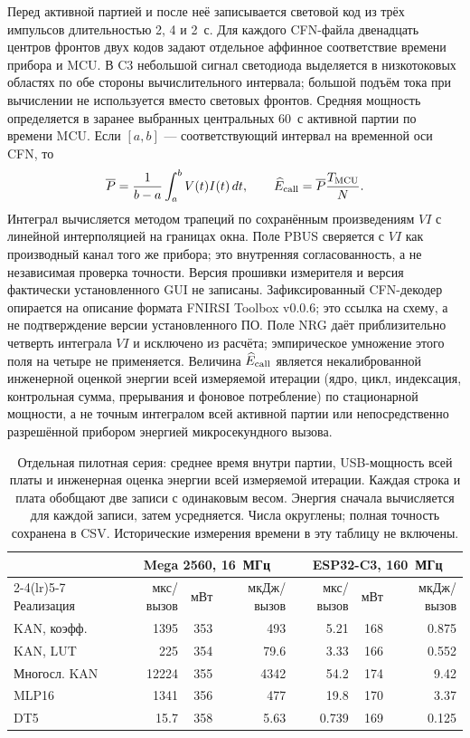 Перед активной партией и после неё записывается световой код из трёх импульсов длительностью 2, 4 и 2~с. Для каждого CFN-файла двенадцать центров фронтов двух кодов задают отдельное аффинное соответствие времени прибора и MCU. В C3 небольшой сигнал светодиода выделяется в низкотоковых областях по обе стороны вычислительного интервала; большой подъём тока при вычислении не используется вместо световых фронтов. Средняя мощность определяется в заранее выбранных центральных 60~с активной партии по времени MCU. Если $[a,b]$ --- соответствующий интервал на временной оси CFN, то
\begin{equation}
\overline P=\frac{1}{b-a}\int_a^b V(t)I(t)\,dt,
\qquad
\widehat E_{\rm call}=\overline P\frac{T_{\rm MCU}}{N}.
\label{eq:energy-pilot}
\end{equation}
Интеграл вычисляется методом трапеций по сохранённым произведениям $V I$ с линейной интерполяцией на границах окна. Поле PBUS сверяется с $V I$ как производный канал того же прибора; это внутренняя согласованность, а не независимая проверка точности. Версия прошивки измерителя и версия фактически установленного GUI не записаны. Зафиксированный CFN-декодер опирается на описание формата FNIRSI Toolbox v0.0.6; это ссылка на схему, а не подтверждение версии установленного ПО. Поле NRG даёт приблизительно четверть интеграла $V I$ и исключено из расчёта; эмпирическое умножение этого поля на четыре не применяется. Величина $\widehat E_{\rm call}$ является некалиброванной инженерной оценкой энергии всей измеряемой итерации (ядро, цикл, индексация, контрольная сумма, прерывания и фоновое потребление) по стационарной мощности, а не точным интегралом всей активной партии или непосредственно разрешённой прибором энергией микросекундного вызова.

\begin{table}[!htbp]
\centering\footnotesize\setlength{\tabcolsep}{4pt}
\caption{Отдельная пилотная серия: среднее время внутри партии, USB-мощность всей платы и инженерная оценка энергии всей измеряемой итерации. Каждая строка и плата обобщают две записи с одинаковым весом. Энергия сначала вычисляется для каждой записи, затем усредняется. Числа округлены; полная точность сохранена в CSV. Исторические измерения времени в эту таблицу не включены.}
\label{tab:energy-pilot}
\begin{tabular}{lrrrrrr}
\toprule
& \multicolumn{3}{c}{Mega 2560, 16~МГц} & \multicolumn{3}{c}{ESP32-C3, 160~МГц}\\
\cmidrule(lr){2-4}\cmidrule(lr){5-7}
Реализация & мкс/вызов & мВт & мкДж/вызов & мкс/вызов & мВт & мкДж/вызов\\
\midrule
KAN, коэфф. & 1395 & 353 & 493 & 5.21 & 168 & 0.875\\
KAN, LUT & 225 & 354 & 79.6 & 3.33 & 166 & 0.552\\
Многосл. KAN & 12224 & 355 & 4342 & 54.2 & 174 & 9.42\\
MLP16 & 1341 & 356 & 477 & 19.8 & 170 & 3.37\\
DT5 & 15.7 & 358 & 5.63 & 0.739 & 169 & 0.125\\
\bottomrule
\end{tabular}
\end{table}

